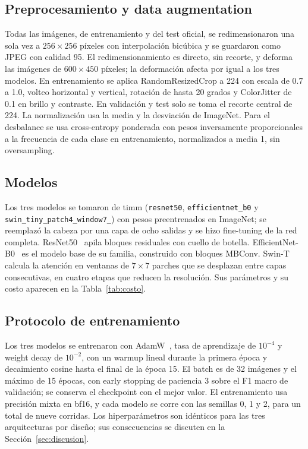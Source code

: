 \documentclass[conference]{IEEEtran}
\begin{document}
\subsection{Preprocesamiento y data augmentation}

Todas las imágenes, de entrenamiento y del test oficial, se redimensionaron una sola vez a $256\times256$ píxeles con interpolación bicúbica y se guardaron como JPEG con calidad 95. El redimensionamiento es directo, sin recorte, y deforma las imágenes de $600\times450$ píxeles; la deformación afecta por igual a los tres modelos. En entrenamiento se aplica RandomResizedCrop a 224 con escala de 0.7 a 1.0, volteo horizontal y vertical, rotación de hasta 20 grados y ColorJitter de 0.1 en brillo y contraste. En validación y test solo se toma el recorte central de 224. La normalización usa la media y la desviación de ImageNet. Para el desbalance se usa cross-entropy ponderada con pesos inversamente proporcionales a la frecuencia de cada clase en entrenamiento, normalizados a media 1, sin oversampling.

\subsection{Modelos}

Los tres modelos se tomaron de timm (\texttt{resnet50}, \texttt{efficientnet\_\allowbreak b0} y \texttt{swin\_tiny\_\allowbreak patch4\_\allowbreak window7\_}) con pesos preentrenados en ImageNet; se reemplazó la cabeza por una capa de ocho salidas y se hizo fine-tuning de la red completa. ResNet50~\cite{he2016resnet} apila bloques residuales con cuello de botella. EfficientNet-B0~\cite{tan2019efficientnet} es el modelo base de su familia, construido con bloques MBConv. Swin-T~\cite{liu2021swin} calcula la atención en ventanas de $7\times7$ parches que se desplazan entre capas consecutivas, en cuatro etapas que reducen la resolución. Sus parámetros y su costo aparecen en la Tabla~\ref{tab:costo}.

\subsection{Protocolo de entrenamiento}

Los tres modelos se entrenaron con AdamW~\cite{loshchilov2019adamw}, tasa de aprendizaje de $10^{-4}$ y weight decay de $10^{-2}$, con un warmup lineal durante la primera época y decaimiento cosine hasta el final de la época 15. El batch es de 32 imágenes y el máximo de 15 épocas, con early stopping de paciencia 3 sobre el F1 macro de validación; se conserva el checkpoint con el mejor valor. El entrenamiento usa precisión mixta en bf16, y cada modelo se corre con las semillas 0, 1 y 2, para un total de nueve corridas. Los hiperparámetros son idénticos para las tres arquitecturas por diseño; sus consecuencias se discuten en la Sección~\ref{sec:discusion}.
\end{document}
